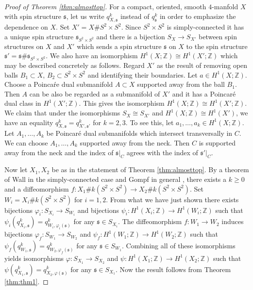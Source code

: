 \documentclass{amsart}
\theoremstyle{definition}
\theoremstyle{remark}
\numberwithin{equation}{section}
\begin{document}
\begin{proof}[Proof of Theorem \ref{thm:almosttop}]
For a compact, oriented, smooth $4$-manfold $X$ with spin structure $\mathfrak{s}$, let us write $q_{X,\mathfrak{s}}^k$ instead of $q_{\mathfrak{s}}^k$ in order to emphasize the dependence on $X$. Set $X' = X \# S^2 \times S^2$. Since $S^2 \times S^2$ is simply-connected it has a unique spin structure $\mathfrak{s}_{S^2 \times S^2}$ and there is a bijection $S_{X} \to S_{X'}$ between spin structures on $X$ and $X'$ which sends a spin structure $\mathfrak{s}$ on $X$ to the spin structure $\mathfrak{s}' = \mathfrak{s} \# \mathfrak{s}_{S^2 \times S^2}$. We also have an isomorphism $H^1(X ; \mathbb{Z}) \cong H^1(X' ; \mathbb{Z})$ which may be described concretely as follows. Regard $X'$ as the result of removing open balls $B_1 \subset X$, $B_2 \subset S^2 \times S^2$ and identifying their boundaries. Let $a \in H^1(X ; \mathbb{Z})$. Choose a Poinca\'re dual submanifold $A \subset X$ supported away from the ball $B_1$. Then $A$ can be also be regarded as a submanifold of $X'$ and it has a Poincar\'e dual class in $H^1(X' ; \mathbb{Z})$. This gives the isomorphism $H^1(X ; \mathbb{Z}) \cong H^1(X' ; \mathbb{Z})$. We claim that under the isomorphisms $S_X \cong S_{X'}$ and $H^1(X ; \mathbb{Z}) \cong H^1(X')$, we have an equality $q_{X , \mathfrak{s}}^k = q_{X' , \mathfrak{s}'}^k$ for $k=2,3$. To see this, let $a_1, \dots , a_k \in H^1(X ; \mathbb{Z})$. Let $A_1, \dots , A_k$ be Poincar\'e dual submanifolds which intersect transversally in $C$. We can choose $A_1, \dots , A_k$ supported away from the neck. Then $C$ is supported away from the neck and the index of $\mathfrak{s}|_C$ agrees with the index of $\mathfrak{s}'|_C$.

Now let $X_1, X_2$ be as in the statement of Theorem \ref{thm:almosttop}. By a theorem of Wall in the simply-connected case \cite{wa} and Gompf in general \cite{gom2}, there exists a $k \ge 0$ and a diffeomorphism $f : X_1 \# k(S^2 \times S^2) \to X_2 \# k(S^2 \times S^2)$. Set $W_i = X_i \# k(S^2 \times S^2)$ for $i=1,2$. From what we have just shown there exists bijections $\varphi_i : S_{X_i} \to S_{W_i}$ and bijections $\psi_i : H^1( X_i ; \mathbb{Z} ) \to H^1(W_i ; \mathbb{Z} )$ such that $\psi_i( q^k_{X_i , \mathfrak{s} } ) = q^k_{W_i , \varphi_i(\mathfrak{s})}$ for any $\mathfrak{s} \in S_{X_i}$. The diffeomorphism $f : W_1 \to W_2$ induces bijections $\varphi_f : S_{W_1} \to S_{W_2}$ and $\psi_f : H^1(W_1 ; \mathbb{Z}) \to H^1(W_2 ; \mathbb{Z})$ such that $\psi_f( q^k_{W_1 , \mathfrak{s}} ) = q^k_{W_2 , \varphi_f(\mathfrak{s})}$ for any $\mathfrak{s} \in S_{W_1}$. Combining all of these isomorphisms yields isomorphisms $\varphi : S_{X_1} \to S_{X_2}$ and $\psi : H^1(X_1 ; \mathbb{Z}) \to H^1(X_2 ; \mathbb{Z})$ such that $\psi( q^k_{X_1 , \mathfrak{s}}) = q^k_{X_2 , \varphi(\mathfrak{s})}$ for any $\mathfrak{s} \in S_{X_1}$. Now the result follows from Theorem \ref{thm:thm1}.
\end{proof}
\end{document}
